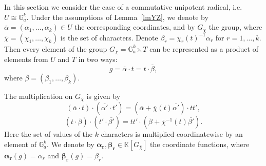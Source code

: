\documentclass[a4paper, 11pt]{amsart}
\theoremstyle{plain}
\theoremstyle{remark}
\theoremstyle{definition}
\newcommand{\KK}{\mathbb{K}}
\newcommand{\G}{\mathbb{G}}
\newcommand{\GG}{G_{\overline{\chi}}}
\newcommand{\ol}[1]{\overline{#1}}
\newcommand{\Alp}[1]{\pmb{\alpha_{#1}}}
\newcommand{\Bet}[1]{\pmb{\beta_{#1}}}
\begin{document}
In this section we consider the case of a commutative unipotent radical, i.e. $U \cong \G_a^k$. Under the assumptions of Lemma~\ref{lmYZ}, we denote by $\ol{\alpha} = (\alpha_1, \ldots, \alpha_k) \in U$ the corresponding coordinates, and by $\GG$ the group, where $\ol{\chi} = (\chi_1, \ldots, \chi_k)$ is the set of characters. Denote $\beta_r = \chi_r(t)^{-1}\alpha_r$ for $r = 1, \ldots, k$. Then every element of the group $\GG = \G_a^k \leftthreetimes T$ can be represented as a product of elements from $U$ and $T$ in two ways: 
\begin{equation*}
g = \ol{\alpha} \cdot t = t \cdot \ol{\beta},
\end{equation*}
where $\ol{\beta} = (\beta_1, \ldots, \beta_k)$. 

The multiplication on $\GG$ is given by
\begin{equation}\label{def:mult}
	(\ol{\alpha}\cdot t) \cdot (\ol{\alpha'}\cdot t') = (\ol{\alpha} + \ol{\chi}(t)\ol{\alpha'}) \cdot tt',
\end{equation}
\begin{equation}
	(t \cdot \ol{\beta}) \cdot (t' \cdot \ol{\beta'}) = tt' \cdot (\ol{\beta} + \ol{\chi}^{-1}(t)\ol{\beta'}).
\end{equation}
Here the set of values of the $k$ characters is multiplied coordinatewise by an element of $\G_a^k$. We denote by $\Alp{r}, \Bet{r} \in \KK[\GG]$ the coordinate functions, where $\Alp{r}(g) = \alpha_r$ and $\Bet{r}(g) = \beta_r$.
\end{document}
